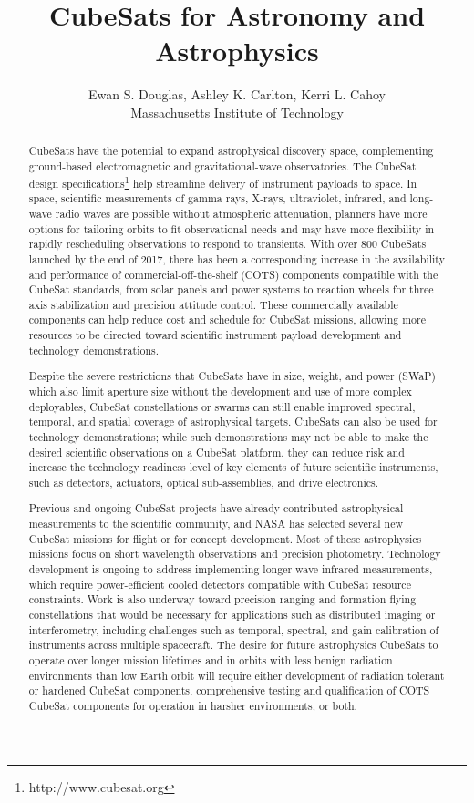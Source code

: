 \documentclass[a4paper]{article}
\title{CubeSats for Astronomy and Astrophysics}
\author{Ewan S. Douglas, Ashley K. Carlton, Kerri L. Cahoy \\ Massachusetts Institute of Technology}
\begin{document}
\maketitle

\begin{abstract}


CubeSats have the potential to expand astrophysical discovery space, complementing ground-based electromagnetic and gravitational-wave observatories. The CubeSat design specifications\footnote{http://www.cubesat.org} help streamline delivery of instrument payloads to space. In space, scientific measurements of gamma rays, X-rays, ultraviolet, infrared, and long-wave radio waves are possible without atmospheric attenuation, planners have more options for tailoring orbits to fit observational needs and may have more flexibility in rapidly rescheduling observations to respond to transients. With over 800 CubeSats launched by the end of 2017, there has been a corresponding increase in the availability and performance of commercial-off-the-shelf (COTS) components compatible with the CubeSat standards, from solar panels and power systems to reaction wheels for three axis stabilization and precision attitude control. These commercially available components can help reduce cost and schedule for CubeSat missions, allowing more resources to be directed toward scientific instrument payload development and technology demonstrations. 

Despite the severe restrictions that CubeSats have in size, weight, and power (SWaP) which also limit aperture size without the development and use of more complex deployables, CubeSat constellations or swarms can still enable improved spectral, temporal, and spatial coverage of astrophysical targets. CubeSats can also be used for technology demonstrations; while such demonstrations may not be able to make the desired scientific observations on a CubeSat platform, they can reduce risk and increase the technology readiness level of key elements of future scientific instruments, such as detectors, actuators, optical sub-assemblies, and drive electronics.

Previous and ongoing CubeSat projects have already contributed astrophysical measurements to the scientific community, and NASA has selected several new CubeSat missions for flight or for concept development. Most of these astrophysics missions focus on short wavelength observations and precision photometry. Technology development is ongoing to address implementing longer-wave infrared measurements, which require power-efficient cooled detectors compatible with CubeSat resource constraints. Work is also underway toward precision ranging and formation flying constellations that would be necessary for applications such as distributed imaging or interferometry, including challenges such as temporal, spectral, and gain calibration of instruments across multiple spacecraft. The desire for future astrophysics CubeSats to operate over longer mission lifetimes and in orbits with less benign radiation environments than low Earth orbit will require either development of radiation tolerant or hardened CubeSat components, comprehensive testing and qualification of COTS CubeSat components for operation in harsher environments, or both. 


\end{abstract}
\end{document}
